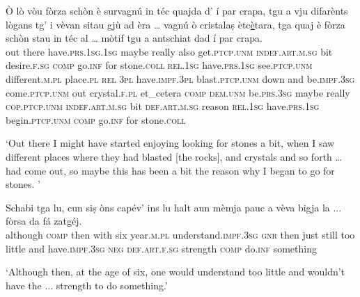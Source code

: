 \begin{linenumbers}
\gll  Ò lò vòu fòrza schòn è survagnú in téc quajda d' í par crapa, tgu a vju difarènts lògans tg’ i vèvan sitau gjù ad èra … vagnú ò cristalaṣ ètc\underline{è}tara, tga quaj è fòrza schòn stau in téc al … mòtif tgu a antschiat dad í par crapa.   \\
out there  have.\textsc{prs.1sg.1sg} maybe really also get.\textsc{ptcp.unm} \textsc{indef.art.m.sg} bit desire.\textsc{f.sg} \textsc{comp} go.\textsc{inf} for stone.\textsc{coll} \textsc{rel.1sg} have.\textsc{prs.1sg} see.\textsc{ptcp.unm} different.\textsc{m.pl} place.\textsc{pl} \textsc{rel} \textsc{3pl} have.\textsc{impf.3pl} blast.\textsc{ptcp.unm} down and be.\textsc{impf.3sg} {} come.\textsc{ptcp.unm} out crystal.\textsc{f.pl} et\_cetera \textsc{comp} \textsc{dem.unm} be.\textsc{prs.3sg} maybe really  \textsc{cop.ptcp.unm} \textsc{indef.art.m.sg} bit \textsc{def.art.m.sg} {} reason \textsc{rel.1sg} have.\textsc{prs.1sg} begin.\textsc{ptcp.unm} \textsc{comp} go.\textsc{inf} for stone.\textsc{coll}\\
\end{linenumbers}
\medskip
\glt `Out there I might have started enjoying looking for stones a bit, when I saw different places where they had blasted [the rocks], and crystals and so forth … had come out, so maybe this has been a bit the reason why I began to go for stones. '
\medskip

\begin{linenumbers}
\gll Schabi tga lu, cun siṣ òns capév’ ins lu halt aun mèmja pauc a vèva bigja la ... fòrsa da fá zatgéj.   \\
although \textsc{comp} then with six year.\textsc{m.pl} understand.\textsc{impf.3sg} \textsc{gnr} then just still too little and have.\textsc{impf.3sg} \textsc{neg} \textsc{def.art.f.sg} {} strength \textsc{comp} do.\textsc{inf} something\\
\end{linenumbers}
\medskip
\glt `Although then, at the age of six, one would understand too little and wouldn’t have the ... strength to do something.'
\medskip

